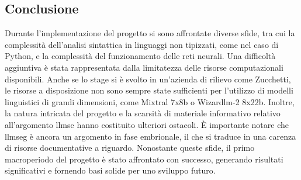     \subsection{Conclusione}
        Durante l'implementazione del progetto si sono affrontate diverse sfide, tra cui la complessità dell'analisi sintattica in linguaggi non tipizzati, 
        come nel caso di Python, e la complessità del funzionamento delle reti neurali. Una difficoltà aggiuntiva è stata rappresentata dalla limitatezza delle risorse computazionali disponibili. 
        Anche se lo stage si è svolto in un'azienda di rilievo come Zucchetti, le risorse a disposizione non sono sempre state sufficienti per l'utilizzo di modelli linguistici di grandi dimensioni, 
        come Mixtral 7x8b o Wizardlm-2 8x22b. Inoltre, la natura intricata del progetto e la scarsità di materiale informativo relativo all'argomento \gls{llmse} hanno costituito ulteriori ostacoli. 
        È importante notare che \gls{llmseg} è ancora un argomento in fase embrionale, il che si traduce in una carenza di risorse documentative a riguardo. Nonostante queste sfide, 
        il primo macroperiodo del progetto è stato affrontato con successo, generando risultati significativi e fornendo basi solide per uno sviluppo futuro.